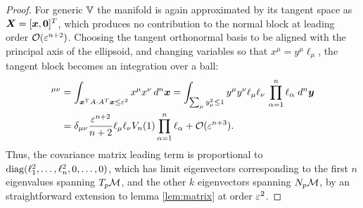 \documentclass[letterpaper, reqno, 11pt]{amsart}
\theoremstyle{definition}
\theoremstyle{remark}
\numberwithin{equation}{section}
\begin{document}
\begin{proof}
For generic $\mathbb{V}$ the manifold is again approximated by its tangent space as $\boldsymbol{X}=[\boldsymbol{x},\boldsymbol{0}]^T$, which produces no contribution to the normal block at leading order ${\mathcal O}(\varepsilon^{n+2})$. Choosing the tangent orthonormal basis to be aligned with the principal axis of the ellipsoid, and changing variables so that $x^\mu=y^\mu\ell_\mu$, the tangent block becomes an integration over a ball:
\begin{align*}
	[C(\Cyll(\vep,\VV))]^{\mu\nu} & = \int_{\bx^TA\cdot A^T\bx\leq\vep^2} x^\mu x^\nu\, d^n\bx = \int_{\sum_\mu y_\mu^2\leq 1} y^\mu y^\nu \ell_\mu\ell_\nu\,\prod^n_{\al=1}\ell_\al\; d^n\by \\
	& = \del_{\mu\nu}\frac{\vep^{n+2}}{n+2}\ell_\mu\ell_\nu V_n(1)\prod^n_{\al=1}\ell_\al + \cO(\vep^{n+3}).
\end{align*}
Thus, the covariance matrix leading term is proportional to $\mathrm{diag}(\ell^2_1,\dots,\ell^2_n,0,\dots,0)$, which has limit eigenvectors corresponding to the first $n$ eigenvalues spanning $T_p{\mathcal M}$, and the other $k$ eigenvectors spanning $N_p{\mathcal M}$, by an straightforward extension to lemma \ref{lem:matrix} at order $\varepsilon^{2}$.


\end{proof}
\end{document}
